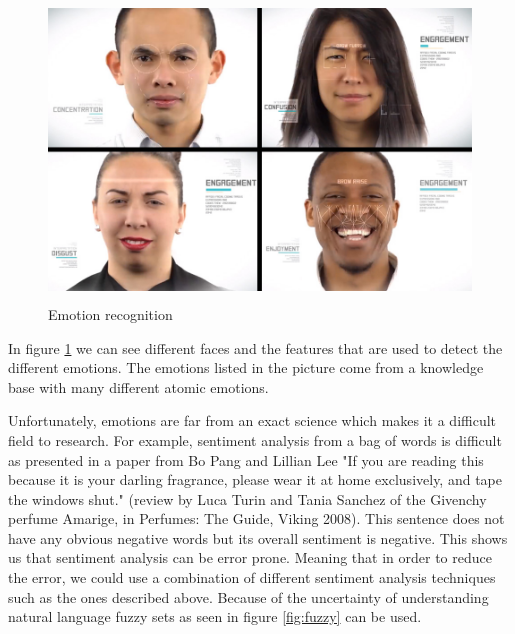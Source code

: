 \documentclass{lncs}
\begin{document}
\begin{figure}%
\includegraphics[width=\linewidth, height=8cm]{original.jpg}
\caption{Emotion recognition \cite{imagerec}}
\label{fig:original}
\end{figure}

In figure \ref{fig:original} we can see different faces and the features that are used to detect the different emotions. The emotions listed in the picture come from a knowledge base with many different atomic emotions.

Unfortunately, emotions are far from an exact science which makes it a difficult field to research. For example, sentiment analysis from a bag of words is difficult as presented in a paper from Bo Pang and Lillian Lee \cite{pang2008opinion} "If you are reading this because it is your darling fragrance, please wear it at home exclusively, and tape the windows shut." (review by Luca Turin and Tania Sanchez of the Givenchy perfume Amarige, in Perfumes: The Guide, Viking 2008). This sentence does not have any obvious negative words but its overall sentiment is negative. This shows us that sentiment analysis can be error prone. Meaning that in order to reduce the error, we could use a combination of different sentiment analysis techniques such as the ones described above. Because of the uncertainty of understanding natural language fuzzy sets as seen in figure \ref{fig:fuzzy} can be used.
\end{document}

